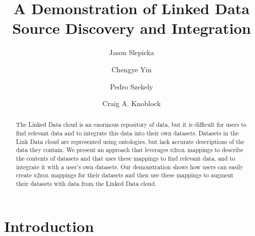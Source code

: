 \documentclass[runningheads,a4paper]{llncs}
\newcommand{\rtworml}{\textsc{r2rml}\xspace}
\begin{document}
\mainmatter  %

\title{A Demonstration of Linked Data Source Discovery and Integration}


%
\author{Jason Slepicka%
\and Chengye Yin\and Pedro Szekely\and Craig A. Knoblock}
%


\maketitle


\begin{abstract}
The Linked Data cloud is an enormous repository of data, but it is difficult for users to find relevant data and to integrate this data into their own datasets. 
Datasets in the Link Data cloud are represented using ontologies, but lack accurate descriptions of the data they contain.
We present an approach that leverages \rtworml mappings to describe the contents of datasets and that uses these mappings to find relevant data, and to integrate it with a user's own datasets.
Our demonstration shows how users can easily create \rtworml mappings for their datasets and then use these mappings to augment their datasets with data from the Linked Data cloud.
\end{abstract}

\section{Introduction} 

\end{document}
